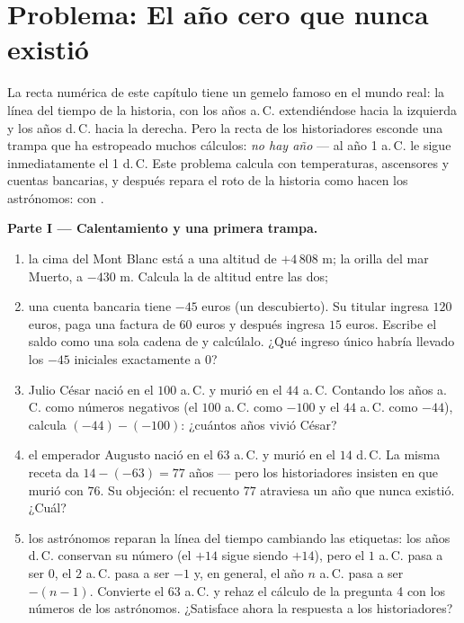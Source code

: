\section{Problema: El año cero que nunca existió}

\begin{problem}
\label{pb:g7:negatives:1}
La recta numérica de este capítulo tiene un gemelo famoso en el mundo real: la
línea del tiempo de la historia, con los años a.\,C. extendiéndose hacia la izquierda y los
años d.\,C. hacia la derecha. Pero la recta de los historiadores esconde una trampa
que ha estropeado muchos cálculos: \emph{no hay año }
--- al año 1 a.\,C. le sigue inmediatamente el 1 d.\,C. Este problema
calcula con temperaturas, ascensores y cuentas bancarias, y después repara
el  roto de la historia como hacen los astrónomos: con .

\medskip
\noindent\textbf{Parte I --- Calentamiento y una primera trampa.}
\begin{enumerate}
  \item la cima del Mont Blanc está a una altitud de $+4\,808$ m; la
        orilla del mar Muerto, a $-430$ m. Calcula la 
        de altitud entre las dos;
  \item una cuenta bancaria tiene $-45$ euros (un descubierto). Su
        titular ingresa $120$ euros, paga una factura de $60$ euros
        y después ingresa $15$ euros. Escribe el saldo como una sola
        cadena de  y calcúlalo. ¿Qué ingreso único
        habría llevado los $-45$ iniciales exactamente a
        $0$?
  \item Julio César nació en el $100$ a.\,C. y murió en el $44$ a.\,C.
        Contando los años a.\,C. como números negativos (el $100$ a.\,C. como
        $-100$ y el $44$ a.\,C. como $-44$), calcula $(-44) - (-100)$: ¿cuántos
        años vivió César?
  \item el emperador Augusto nació en el $63$ a.\,C. y murió en el $14$
        d.\,C. La misma receta da $14 - (-63) = 77$ años ---
        pero los historiadores insisten en que murió con $76$. Su objeción:
        el recuento $77$ atraviesa un año que nunca existió.
        ¿Cuál?
  \item los astrónomos reparan la línea del tiempo cambiando las etiquetas: los años d.\,C.
        conservan su número (el $+14$ sigue siendo $+14$), pero el $1$ a.\,C.
        pasa a ser $0$, el $2$ a.\,C. pasa a ser $-1$ y, en general, el año
        $n$ a.\,C. pasa a ser $-(n - 1)$. Convierte el $63$ a.\,C. y rehaz
        el cálculo de la pregunta 4 con los números de los astrónomos.
        ¿Satisface ahora la respuesta a los historiadores?
\end{enumerate}


\end{problem}
